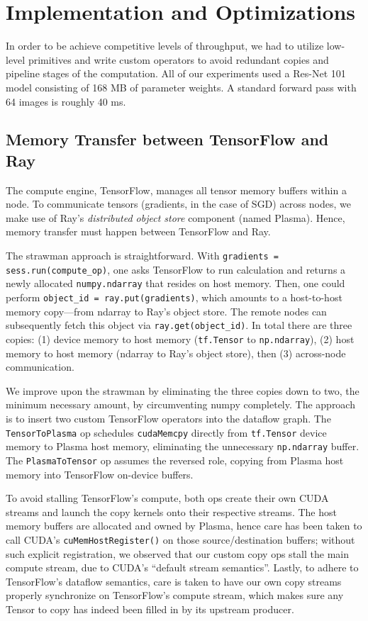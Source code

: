 \section{Implementation and Optimizations}
In order to be achieve competitive levels of throughput, we had to utilize low-level primitives and write custom operators to avoid redundant copies and pipeline stages of the computation. All of our experiments used a Res-Net 101 model consisting of 168 MB of parameter weights. A standard forward pass with 64 images is roughly 40 ms.

\subsection{Memory Transfer between TensorFlow and Ray}
The compute engine, TensorFlow, manages all tensor memory buffers within a node.  To communicate tensors (gradients, in the case of SGD) across nodes, we make use of Ray's \textit{distributed object store} component (named Plasma).  Hence, memory transfer must happen between TensorFlow and Ray.

The strawman approach is straightforward.  With \texttt{gradients = sess.run(compute\_op)}, one asks TensorFlow to run calculation and returns a newly allocated \texttt{numpy.ndarray} that resides on host memory.  Then, one could perform \texttt{object\_id = ray.put(gradients)}, which amounts to a host-to-host memory copy---from ndarray to Ray's object store.  The remote nodes can subsequently fetch this object via \texttt{ray.get(object\_id)}.  In total there are three copies: (1) device memory to host memory (\texttt{tf.Tensor} to \texttt{np.ndarray}), (2) host memory to host memory (ndarray to Ray's object store), then (3) across-node communication.

We improve upon the strawman by eliminating the three copies down to two, the minimum necessary amount, by circumventing numpy completely.  The approach is to insert two custom TensorFlow operators into the dataflow graph.  The \texttt{TensorToPlasma} op schedules \texttt{cudaMemcpy} directly from \texttt{tf.Tensor} device memory to Plasma host memory, eliminating the unnecessary \texttt{np.ndarray} buffer.  The \texttt{PlasmaToTensor} op assumes the reversed role, copying from Plasma host memory into TensorFlow on-device buffers.

To avoid stalling TensorFlow's compute, both ops create their own CUDA streams and launch the copy kernels onto their respective streams.  The host memory buffers are allocated and owned by Plasma, hence care has been taken to call CUDA's \texttt{cuMemHostRegister()} on those source/destination buffers; without such explicit registration, we observed that our custom copy ops stall the main compute stream, due to CUDA's ``default stream semantics''.  Lastly, to adhere to TensorFlow's dataflow semantics, care is taken to have our own copy streams properly synchronize on TensorFlow's compute stream, which makes sure any Tensor to copy has indeed been filled in by its upstream producer.

